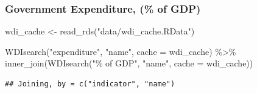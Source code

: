 \documentclass[
]{article}
\newenvironment{Shaded}{\begin{snugshade}}{\end{snugshade}}
\newcommand{\AttributeTok}[1]{\textcolor[rgb]{0.77,0.63,0.00}{#1}}
\newcommand{\FunctionTok}[1]{\textcolor[rgb]{0.00,0.00,0.00}{#1}}
\newcommand{\NormalTok}[1]{#1}
\newcommand{\OtherTok}[1]{\textcolor[rgb]{0.56,0.35,0.01}{#1}}
\newcommand{\SpecialCharTok}[1]{\textcolor[rgb]{0.00,0.00,0.00}{#1}}
\newcommand{\StringTok}[1]{\textcolor[rgb]{0.31,0.60,0.02}{#1}}
\begin{document}
\hypertarget{government-expenditure-of-gdp}{%
\subsubsection{Government Expenditure, (\% of
GDP)}\label{government-expenditure-of-gdp}}

\begin{Shaded}
\begin{Highlighting}[]
\NormalTok{wdi\_cache }\OtherTok{\textless{}{-}} \FunctionTok{read\_rds}\NormalTok{(}\StringTok{"data/wdi\_cache.RData"}\NormalTok{)}
\end{Highlighting}
\end{Shaded}

\begin{Shaded}
\begin{Highlighting}[]
\FunctionTok{WDIsearch}\NormalTok{(}\StringTok{"expenditure"}\NormalTok{, }\StringTok{"name"}\NormalTok{, }\AttributeTok{cache =}\NormalTok{ wdi\_cache) }\SpecialCharTok{\%\textgreater{}\%} 
  \FunctionTok{inner\_join}\NormalTok{(}\FunctionTok{WDIsearch}\NormalTok{(}\StringTok{"\% of GDP"}\NormalTok{, }\StringTok{"name"}\NormalTok{, }\AttributeTok{cache =}\NormalTok{ wdi\_cache))}
\end{Highlighting}
\end{Shaded}

\begin{verbatim}
## Joining, by = c("indicator", "name")
\end{verbatim}
\end{document}
